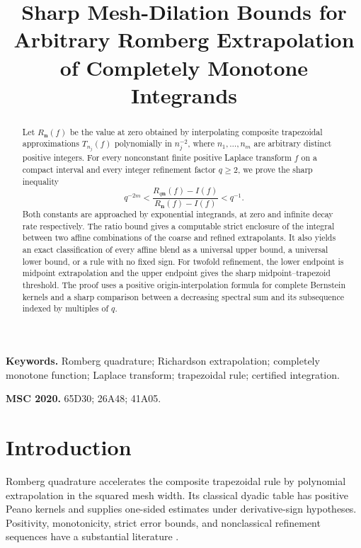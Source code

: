 \documentclass[11pt]{article}
\title{Sharp Mesh-Dilation Bounds for Arbitrary Romberg
Extrapolation of Completely Monotone Integrands}
\author{}
\date{}
\theoremstyle{definition}
\theoremstyle{remark}
\newcommand{\bN}{\boldsymbol{n}}
\newcommand{\1}{\mathbf{1}}
\begin{document}
\maketitle

\begin{abstract}
Let \(R_{\bN}(f)\) be the value at zero obtained by interpolating
composite trapezoidal approximations \(T_{n_j}(f)\) polynomially in
\(n_j^{-2}\), where \(n_1,\ldots,n_m\) are arbitrary distinct positive
integers. For every nonconstant finite positive Laplace transform \(f\) on a
compact interval and every integer refinement factor \(q\ge2\), we prove the
sharp inequality
\[
q^{-2m}
<
\frac{R_{q\bN}(f)-I(f)}
     {R_{\bN}(f)-I(f)}
<
q^{-1}.
\]
Both constants are approached by exponential integrands, at zero and infinite
decay rate respectively. The ratio bound gives a computable strict enclosure
of the integral between two affine combinations of the coarse and refined
extrapolants. It also yields an exact classification of every affine blend as
a universal upper bound, a universal lower bound, or a rule with no fixed
sign. For twofold refinement, the lower endpoint is midpoint extrapolation and
the upper endpoint gives the sharp midpoint--trapezoid threshold. The proof
uses a positive origin-interpolation formula for complete Bernstein kernels
and a sharp comparison between a decreasing spectral sum and its subsequence
indexed by multiples of \(q\).
\end{abstract}

\noindent\textbf{Keywords.}
Romberg quadrature; Richardson extrapolation; completely monotone function;
Laplace transform; trapezoidal rule; certified integration.

\medskip
\noindent\textbf{MSC 2020.}
65D30; 26A48; 41A05.

\section{Introduction}

Romberg quadrature accelerates the composite trapezoidal rule by polynomial
extrapolation in the squared mesh width. Its classical dyadic table has
positive Peano kernels and supplies one-sided estimates under derivative-sign
hypotheses. Positivity, monotonicity, strict error bounds, and nonclassical
refinement sequences have a substantial literature
\cite{MeirSharma1965,Stroud1965,BulirschStoer1966,
BulirschStoer1967,Lynch1967,Albrecht1972,DahlquistBjorck,Strom1967,
Strom1972,Foerster1982,BrassFischer1999,Fischer2002,BrassPetras}.
\end{document}
